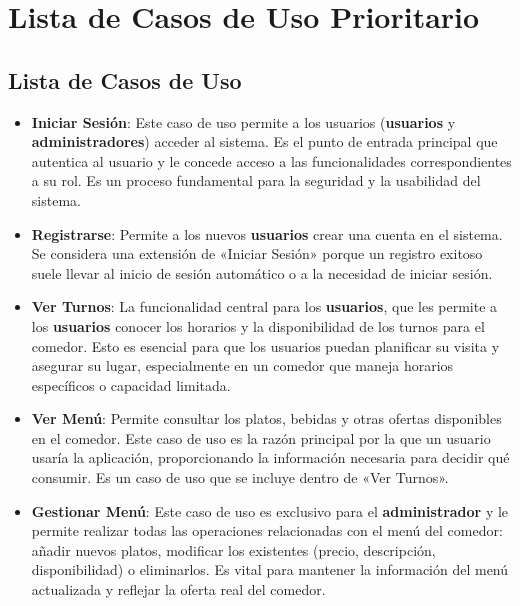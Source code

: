 \documentclass[12pt]{article}
\begin{document}
\pagebreak

\section{Lista de Casos de Uso Prioritario}

\subsection*{Lista de Casos de Uso}

\begin{itemize}
	\item \textbf{Iniciar Sesión}: Este caso de uso permite a los usuarios (\textbf{usuarios} y \textbf{administradores}) acceder al sistema. Es el punto de entrada principal que autentica al usuario y le concede acceso a las funcionalidades correspondientes a su rol. Es un proceso fundamental para la seguridad y la usabilidad del sistema.

	\item \textbf{Registrarse}: Permite a los nuevos \textbf{usuarios} crear una cuenta en el sistema. Se considera una extensión de «Iniciar Sesión» porque un registro exitoso suele llevar al inicio de sesión automático o a la necesidad de iniciar sesión.

	\item \textbf{Ver Turnos}: La funcionalidad central para los \textbf{usuarios}, que les permite a los \textbf{usuarios} conocer los horarios y la disponibilidad de los turnos para el comedor. Esto es esencial para que los usuarios puedan planificar su visita y asegurar su lugar, especialmente en un comedor que maneja horarios específicos o capacidad limitada.

	\item \textbf{Ver Menú}: Permite consultar los platos, bebidas y otras ofertas disponibles en el comedor. Este caso de uso es la razón principal por la que un usuario usaría la aplicación, proporcionando la información necesaria para decidir qué consumir. Es un caso de uso que se incluye dentro de «Ver Turnos».

	\item \textbf{Gestionar Menú}: Este caso de uso es exclusivo para el \textbf{administrador} y le permite realizar todas las operaciones relacionadas con el menú del comedor: añadir nuevos platos, modificar los existentes (precio, descripción, disponibilidad) o eliminarlos. Es vital para mantener la información del menú actualizada y reflejar la oferta real del comedor.


\end{itemize}
\end{document}
